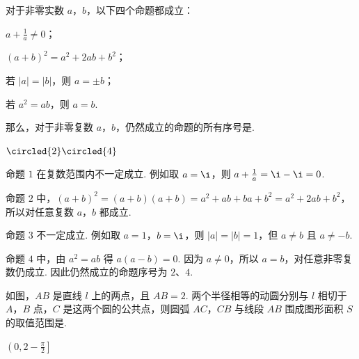 \begin{problem}
对于非零实数 \(a\)，\(b\)，以下四个命题都成立：

\begin{circlelist}
\item \(a + \frac{1}{a} \neq 0\)；
\item \((a + b)^2 = a^2 + 2ab + b^2\)；
\item 若 \(|a| = |b|\)，则 \(a = \pm b\)；
\item 若 \(a^2 = ab\)，则 \(a = b\).
\end{circlelist}

那么，对于非零复数 \(a\)，\(b\)，仍然成立的命题的所有序号是\fillinblank{}.
\end{problem}

\begin{answer}
\(\circled{2}\circled{4}\)
\end{answer}

\begin{solution}
命题 \(1\) 在复数范围内不一定成立. 例如取 \(a=\i\)，则 \(a+\frac{1}{a}=\i-\i=0\).

命题 \(2\) 中，\((a+b)^2=(a+b)(a+b)=a^2+ab+ba+b^2=a^2+2ab+b^2\)，所以对任意复数 \(a\)，\(b\) 都成立.

命题 \(3\) 不一定成立. 例如取 \(a=1\)，\(b=\i\)，则 \(|a|=|b|=1\)，但 \(a\neq b\) 且 \(a\neq-b\).

命题 \(4\) 中，由 \(a^2=ab\) 得 \(a(a-b)=0\). 因为 \(a\neq0\)，所以 \(a=b\)，对任意非零复数仍成立. 因此仍然成立的命题序号为 \(2\)、\(4\).
\end{solution}

\begin{problem}
如图，\(AB\) 是直线 \(l\) 上的两点，且 \(AB = 2\). 两个半径相等的动圆分别与 \(l\) 相切于 \(A\)，\(B\) 点，\(C\) 是这两个圆的公共点，则圆弧 \(AC\)，\(CB\) 与线段 \(AB\) 围成图形面积 \(S\) 的取值范围是\fillinblank{}.

\end{problem}

\begin{answer}
\(\left(0,2-\frac{\pi}{2}\right]\)
\end{answer}

